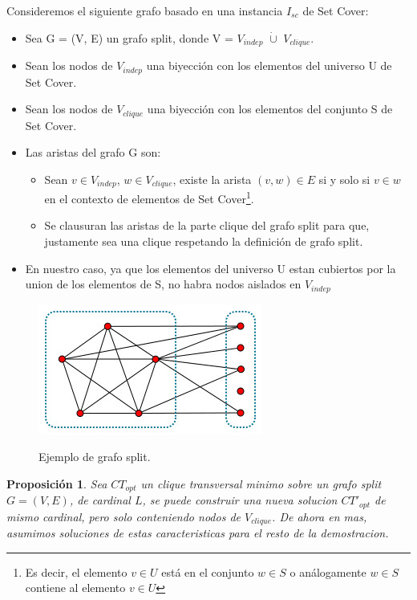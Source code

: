 \documentclass[10pt,a4paper]{article}
\newtheorem{proposition}{Proposici\'on}
\begin{document}
Consideremos el siguiente grafo basado en una instancia $I_{sc}$ de Set Cover:
\begin{itemize}
    \item Sea G = (V, E) un grafo split, donde V = $V_{indep}$ $\dot{\cup}$ $V_{clique}$.
    \item Sean los nodos de $V_{indep}$ una biyección con los elementos del universo U de Set Cover.
    \item Sean los nodos de $V_{clique}$ una biyección con los elementos del conjunto S de Set Cover.
    \item Las aristas del grafo G son:
    \begin{itemize}
        \item Sean $v \in V_{indep}$, $w \in V_{clique}$, existe la arista $(v, w) \in E$ si y solo si $v \in w$ en el contexto de elementos de Set Cover\footnote{Es decir, el elemento $v \in U$ está en el conjunto $w \in S$ o análogamente $w \in S$ contiene al elemento $v \in U$}.
        \item Se clausuran las aristas de la parte clique del grafo split para que, justamente sea una clique respetando la definición de grafo split.
    \end{itemize}
    \item En nuestro caso, ya que los elementos del universo U estan cubiertos por la union de los elementos de S, no habra nodos aislados en $V_{indep}$ 
\end{itemize}

\begin{figure}[H]
    \centering
    \includegraphics[scale=0.75]{fig/Split_graph.jpg}
    \label{fig:split_graph}
    \caption{Ejemplo de grafo split.}
\end{figure}

\begin{proposition}
Sea $CT_{opt}$ un clique transversal minimo sobre un grafo split $G = (V, E)$, de cardinal $L$, se puede construir una nueva solucion $CT'_{opt}$ de mismo cardinal, pero solo conteniendo nodos de $V_{clique}$. De ahora en mas, asumimos soluciones de estas caracteristicas para el resto de la demostracion.
\end{proposition}
\end{document}
